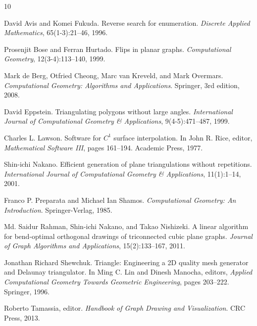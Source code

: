 \documentclass[12pt,a4paper]{article}
\begin{document}




\begin{thebibliography}{10}

David Avis and Komei Fukuda.
\newblock Reverse search for enumeration.
\newblock \emph{Discrete Applied Mathematics}, 65(1-3):21--46, 1996.

Prosenjit Bose and Ferran Hurtado.
\newblock Flips in planar graphs.
\newblock \emph{Computational Geometry}, 12(3-4):113--140, 1999.

Mark de Berg, Otfried Cheong, Marc van Kreveld, and Mark Overmars.
\newblock \emph{Computational Geometry: Algorithms and Applications}.
\newblock Springer, 3rd edition, 2008.

David Eppstein.
\newblock Triangulating polygons without large angles.
\newblock \emph{International Journal of Computational Geometry \& Applications}, 9(4-5):471--487, 1999.

Charles L. Lawson.
\newblock Software for $C^1$ surface interpolation.
\newblock In John R. Rice, editor, \emph{Mathematical Software III}, pages 161--194. Academic Press, 1977.

Shin-ichi Nakano.
\newblock Efficient generation of plane triangulations without repetitions.
\newblock \emph{International Journal of Computational Geometry \& Applications}, 11(1):1--14, 2001.

Franco P. Preparata and Michael Ian Shamos.
\newblock \emph{Computational Geometry: An Introduction}.
\newblock Springer-Verlag, 1985.

Md. Saidur Rahman, Shin-ichi Nakano, and Takao Nishizeki.
\newblock A linear algorithm for bend-optimal orthogonal drawings of triconnected cubic plane graphs.
\newblock \emph{Journal of Graph Algorithms and Applications}, 15(2):133--167, 2011.

Jonathan Richard Shewchuk.
\newblock Triangle: Engineering a 2D quality mesh generator and Delaunay triangulator.
\newblock In Ming C. Lin and Dinesh Manocha, editors, \emph{Applied Computational Geometry Towards Geometric Engineering}, pages 203--222. Springer, 1996.

Roberto Tamassia, editor.
\newblock \emph{Handbook of Graph Drawing and Visualization}.
\newblock CRC Press, 2013.

\end{thebibliography}
\end{document}
